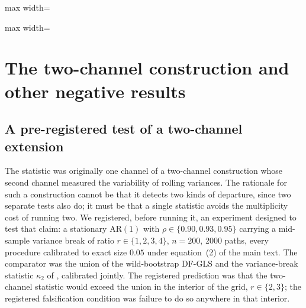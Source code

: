 \documentclass[11pt]{article}
\begin{document}
\begin{table}[htbp]
\centering
\caption{As \cref{tab:dgp5}, computed with $\theta = 0.02$.}
\label{tab:dgp502}
\small
\begin{adjustbox}{max width=\textwidth}

\end{adjustbox}
\par\medskip\begin{minipage}{\textwidth}\footnotesize

\end{minipage}
\end{table}

\begin{table}[htbp]
\centering
\caption{As \cref{tab:fp}, computed with $\theta = 0.02$.}
\label{tab:fp02}
\small
\begin{adjustbox}{max width=\textwidth}

\end{adjustbox}
\par\medskip\begin{minipage}{\textwidth}\footnotesize

\end{minipage}
\end{table}

\FloatBarrier
\section{The two-channel construction and other negative results}\label{supp:s6}

\subsection*{A pre-registered test of a two-channel extension}

The statistic was originally one channel of a two-channel construction
whose second channel measured the variability of rolling variances. The
rationale for such a construction cannot be that it detects two kinds of
departure, since two separate tests also do; it must be that a single
statistic avoids the multiplicity cost of running two. We registered,
before running it, an experiment designed to test that claim: a
stationary AR$(1)$ with $\rho \in \{0.90, 0.93, 0.95\}$ carrying a
mid-sample variance break of ratio $r \in \{1, 2, 3, 4\}$, $n = 200$,
2000 paths, every procedure calibrated to exact size $0.05$ under
equation~(2) of the main text. The comparator was the union of the wild-bootstrap
DF-GLS and the variance-break statistic $\kappa_2$ of
\citet{sanso2004testing}, calibrated jointly. The registered prediction
was that the two-channel statistic would exceed the union in the interior
of the grid, $r \in \{2, 3\}$; the registered falsification condition was
failure to do so anywhere in that interior.
\end{document}
